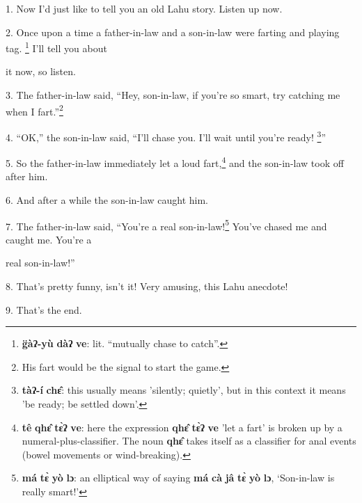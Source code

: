 \setcounter{footnote}{0}

1. Now I'd just like to tell you an old Lahu story. Listen up now.

2. Once upon a time a father-in-law and a son-in-law were farting and playing tag.
\footnote{\textbf{g̈àʔ-yù} \textbf{dàʔ} \textbf{ve}: lit. ``mutually chase to catch''.} I'll tell you about

it now, so listen.

3. The father-in-law said, ``Hey, son-in-law, if you're so smart, try catching
me when I fart.''\footnote{His fart would be the signal to start the game.}

4. ``OK,'' the son-in-law said, ``I'll chase you. I'll wait until you're ready!
\footnote{\textbf{tàʔ-í} \textbf{chɛ̂}: this usually means 'silently; quietly', but in this context it means 'be ready; be settled down'.}''

5. So the father-in-law immediately let a loud fart,\footnote{\textbf{tê} \textbf{qhɛ̂} \textbf{tɛ̀ʔ} \textbf{ve}: here the expression \textbf{qhɛ̂} \textbf{tɛ̀ʔ} \textbf{ve} 'let a fart' is broken up by a numeral-plus-classifier. The noun \textbf{qhɛ̂} takes itself as a classifier for anal events (bowel movements or wind-breaking).} and the son-in-law took
off after him.

6. And after a while the son-in-law caught him.

7. The father-in-law said, ``You're a real son-in-law!\footnote{\textbf{má} \textbf{tɛ̀} \textbf{yò} \textbf{lɔ}: an elliptical way of saying \textbf{má} \textbf{cà} \textbf{jâ} \textbf{tɛ̀} \textbf{yò} \textbf{lɔ}, `Son-in-law is really smart!'} You've chased me and
caught me. You're a

real son-in-law!''

8. That's pretty funny, isn't it! Very amusing, this Lahu anecdote!

9. That's the end.

